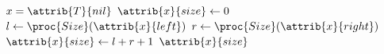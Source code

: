 \begin{codebox}
\li \If $x = \attrib{T}{nil}$
\li \Then
        $\attrib{x}{size} \gets 0$
\li \Else
\li     $l \gets \proc{Size}(\attrib{x}{left})$
\li     $r \gets \proc{Size}(\attrib{x}{right})$
\li     $\attrib{x}{size} \gets l + r + 1$
    \End
\li \Return $\attrib{x}{size}$
\end{codebox}